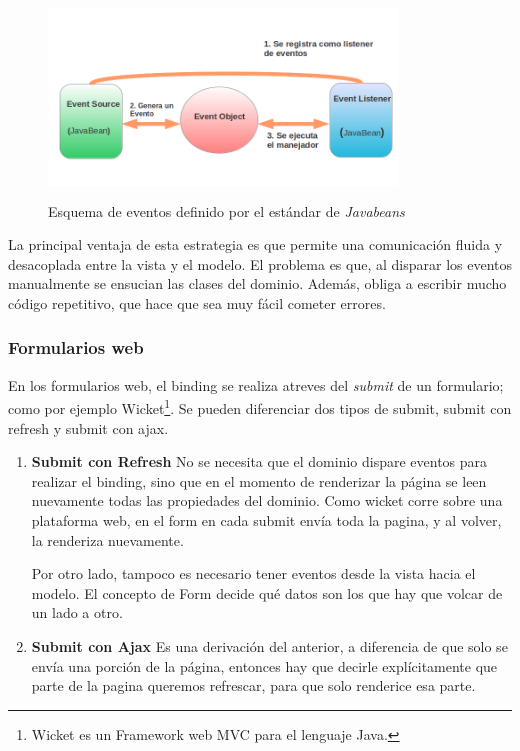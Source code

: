 	
	 \begin{figure}[h]
		\includegraphics[width=350px, height=200px]{img/javabeans}
		\caption{Esquema de eventos definido por el estándar de \emph{Javabeans}}
		\label{javabeans}
	\end{figure}

	La principal ventaja de esta estrategia es que
	permite una comunicación fluida y desacoplada entre la vista y el modelo.
	El problema es que, al disparar los eventos manualmente se ensucian las clases
	del dominio. Además, obliga a escribir mucho código repetitivo, que hace que
	sea muy fácil cometer errores.

\subsubsection{Formularios web}
	En los formularios web, el binding se realiza atreves del \emph{submit} de un
	formulario; como por ejemplo Wicket\footnote{Wicket es un Framework web MVC
	para el lenguaje Java.}. 
	Se pueden diferenciar dos tipos de submit, submit con refresh y submit con
	ajax.
	 
	\begin {enumerate}
	
		\item{\bf Submit con Refresh}  No se necesita que el dominio dispare eventos
		para realizar el binding, sino que en el momento de renderizar la página se
		leen nuevamente todas las propiedades del dominio.
		Como wicket corre sobre una plataforma web, en el form en cada submit envía  
		toda la pagina, y al volver, la renderiza nuevamente.
		
		Por otro lado, tampoco es necesario tener eventos desde la vista hacia el
		modelo. El concepto de Form decide qué datos son los que hay que volcar de un
		lado a otro.
	
		\item {\bf Submit con Ajax} 
		Es una derivación del anterior, a diferencia de que solo se envía
		una porción de la página, entonces hay que decirle explícitamente que parte
		de la pagina queremos refrescar, para que solo renderice esa parte.

	\end {enumerate}
		
